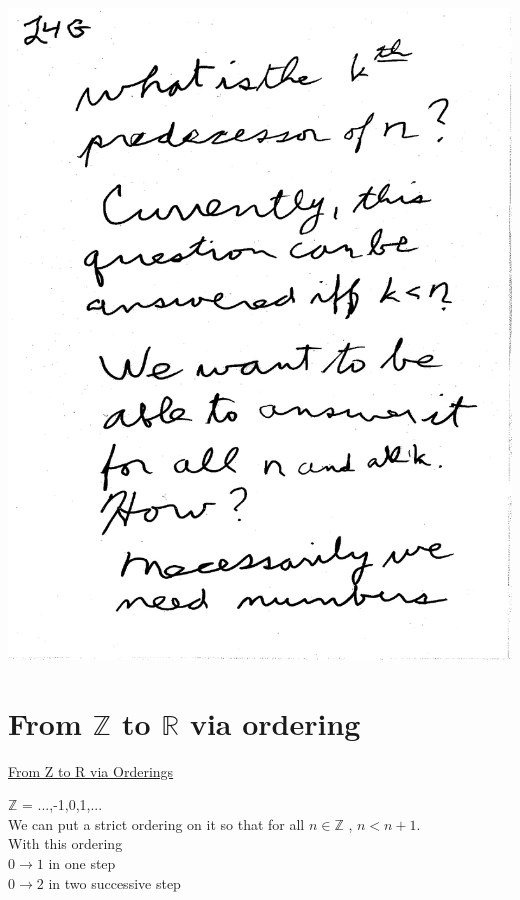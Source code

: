 \documentclass[10pt,a4paper]{article}
\begin{document}
{{\includegraphics[scale=0.5]{Pages/generateN7.pdf}

\newpage


\newpage

\section{From $\mathbb{Z}$ to $\mathbb{R}$ via ordering}

\large
\underline{From Z to R via Orderings}\\

\normalsize

$\mathbb{Z}$ = {...,-1,0,1,...}\\We can put a strict ordering on it so that for all $n \in \mathbb{Z}$ , $n<n+1$.\\

With this ordering\\
	$0 \rightarrow 1$ in one step\\
	$0 \rightarrow 2$ in two successive step\\

}}
\end{document}

